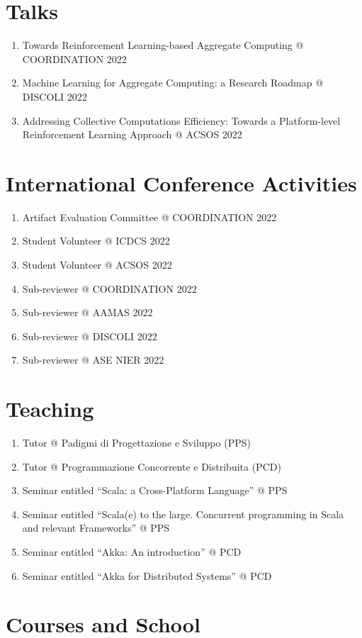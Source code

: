 \documentclass[11pt]{article}
\begin{document}
\section{Talks}
\begin{enumerate}
	\item Towards Reinforcement Learning-based Aggregate Computing @ COORDINATION 2022
	\item Machine Learning for Aggregate Computing: a Research Roadmap @ DISCOLI 2022
	\item Addressing Collective Computations Efficiency: Towards a Platform-level Reinforcement Learning Approach @ ACSOS 2022
\end{enumerate}
\section{International Conference Activities}
\begin{enumerate}
	\item Artifact Evaluation Committee @ COORDINATION 2022
	\item Student Volunteer @ ICDCS 2022
	\item Student Volunteer @ ACSOS 2022
	\item Sub-reviewer @ COORDINATION 2022
	\item Sub-reviewer @ AAMAS 2022
	\item Sub-reviewer @ DISCOLI 2022
	\item Sub-reviewer @ ASE NIER 2022
\end{enumerate}
\section{Teaching}
\begin{enumerate}
	\item Tutor @ Padigmi di Progettazione e Sviluppo (PPS)
	\item Tutor @ Programmazione Concorrente e Distribuita (PCD)
	\item Seminar entitled ``Scala: a Cross-Platform Language'' @ PPS
	\item Seminar entitled ``Scala(e) to the large. Concurrent programming in Scala and relevant Frameworks'' @ PPS
	\item Seminar entitled ``Akka: An introduction'' @ PCD
	\item Seminar entitled ``Akka for Distributed Systems'' @ PCD
\end{enumerate}
\section{Courses and School}
\end{document}
